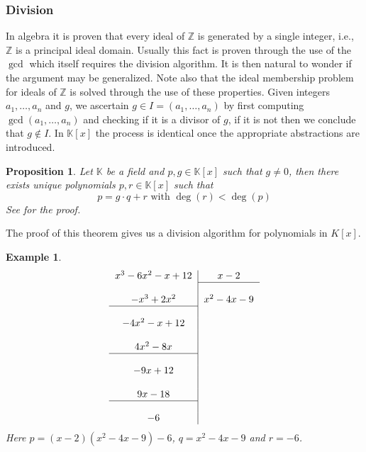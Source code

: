 \documentclass[a4paper,12pt]{article}
\newtheorem{example}[theorem]{Example}
\newtheorem{proposition}[theorem]{Proposition}
\newcommand{\KK}{\mathbb{K}}
\newcommand{\ZZ}{\mathbb{Z}}
\begin{document}
\subsubsection{Division}
In algebra it is proven that every ideal of $\ZZ$ is generated by a single integer, i.e., $\ZZ$ is a principal ideal domain. Usually this fact is proven through the use of the $\gcd$ which itself requires the division algorithm. It is then natural to wonder if the argument may be generalized. Note also that the ideal membership problem for ideals of $\ZZ$ is solved through the use of these properties. Given integers $a_1, \ldots, a_n$ and $g$, we ascertain $g \in I = (a_1, \ldots, a_n)$ by first computing $\gcd(a_1, \ldots, a_n)$ and checking if it is a divisor of $g$, if it is not then we conclude that $g \notin I$. In $\KK[x]$ the process is identical once the appropriate abstractions are introduced.

\begin{proposition}
	Let $\KK$ be a field and $p,g \in \KK[x]$ such that $g \neq 0$, then there exists unique polynomials $p,r \in \KK[x]$ such that $$ p = g\cdot q + r \text{ with } \deg(r) < \deg(p)$$
	See \cite{Fer2019} for the proof.
\end{proposition}
The proof of this theorem gives us a division algorithm for polynomials in $K[x]$.
\begin{example}
	\[
	\begin{tabular}{c|c} 
	$ x^3 - 6x^2 -x +12 $ & $ x - 2 $ \\ \cline{2-2} \\
	$ -x^3 + 2x^2 $ & $ x^2 - 4x - 9$ \\ \cline{1-1} \\
	$ -4x^2 -x +12 $ & \\ \\
	$ 4x^2 - 8x $ & \\ \cline{1-1} \\			
	$ -9x + 12 $  & \\ \\
	$ 9x - 18 $ & \\ \cline{1-1} \\
	$ -6 $
	\end{tabular}
	\]
	Here $p = (x-2)(x^2-4x-9)-6$, $q = x^2-4x-9$ and $r = -6$.
\end{example}
\end{document}
